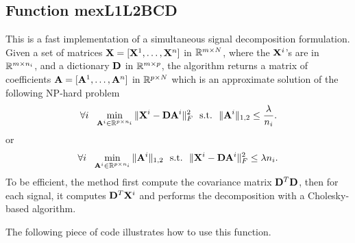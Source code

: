 \documentclass[a4paper, 11pt]{article}
\begin{document}
\subsection{Function mexL1L2BCD}
This is a fast implementation of a simultaneous signal decomposition formulation. Given a set of matrices ${\mathbf X}=[{\mathbf X}^1,\ldots,{\mathbf X}^n]$  in ${\mathbb R}^{m \times N}$, where the ${\mathbf X}^i$'s are in ${\mathbb R}^{m \times n_i}$, and a dictionary ${\mathbf D}$ in ${\mathbb R}^{m \times p}$, the algorithm returns a matrix of coefficients ${\mathbf A}=[{\mathbf A}^1,\ldots,{\mathbf A}^n]$ in ${\mathbb R}^{p \times N}$ which is an approximate solution of the following NP-hard problem
\begin{equation}
\forall i~~ \min_{{\mathbf A}^i \in {\mathbb R}^{p \times n_i}} \|{\mathbf X}^i-{\mathbf D}{\mathbf A}^i\|_F^2 ~~\text{s.t.}~~ \|{\mathbf A}^i\|_{1,2} \leq \frac{\lambda}{n_i}.
\end{equation}
or
\begin{equation}
\forall i~~ \min_{{\mathbf A}^i \in {\mathbb R}^{p \times n_i}}  \|{\mathbf A}^i\|_{1,2} ~~\text{s.t.}~~ \|{\mathbf X}^i-{\mathbf D}{\mathbf A}^i\|_F^2 \leq \lambda n_i.
\end{equation}
To be efficient, the method first compute the covariance matrix ${\mathbf D}^T{\mathbf D}$, then for each signal, it computes ${\mathbf D}^T{\mathbf X}^i$ and performs the decomposition with a Cholesky-based algorithm.


The following piece of code illustrates how to use this function.

\end{document}
